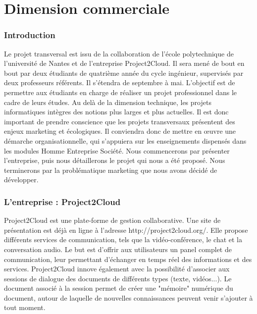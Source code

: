 
	\part{Dimension commerciale}
	
	\setcounter{chapter}{1} %
	\setcounter{section}{0} %
	
	\section{Introduction}
	Le projet transversal est issu de la collaboration de l'école polytechnique de l'université de Nantes et de l'entreprise Project2Cloud. Il sera mené de bout en bout par deux étudiants de quatrième année du cycle ingénieur, supervisés par deux professeurs référents. Il s'étendra de septembre à mai. L'objectif est de permettre aux étudiants en charge de réaliser un projet professionnel dans le cadre de leurs études. Au delà de la dimension technique, les projets informatiques intègres des notions plus larges et plus actuelles. Il est donc important de prendre conscience que les projets transversaux présentent des enjeux marketing et écologiques. Il conviendra donc de mettre en œuvre une démarche organisationnelle, qui s'appuiera sur les enseignements dispensés dans les modules Homme Entreprise Société. 
	Nous commencerons par présenter l'entreprise, puis nous détaillerons le projet qui nous a été proposé. Nous terminerons par la problématique marketing que nous avons décidé de développer. 

	\section{L'entreprise : Project2Cloud}
	Project2Cloud est une plate-forme de gestion collaborative. Une site de présentation est déjà en ligne à l'adresse http://project2cloud.org/. Elle propose différents services de communication, tels que la vidéo-conférence, le chat et la conversation audio. Le but est d'offrir aux utilisateurs un panel complet de communication, leur permettant d'échanger en temps réel des informations et des services. Project2Cloud innove également avec la possibilité d'associer aux sessions de dialogue des documents de différents types (texte, vidéos...). Le document associé à la session permet de créer une "mémoire" numérique du document, autour de laquelle de nouvelles connaissances peuvent venir s'ajouter à tout moment. 

